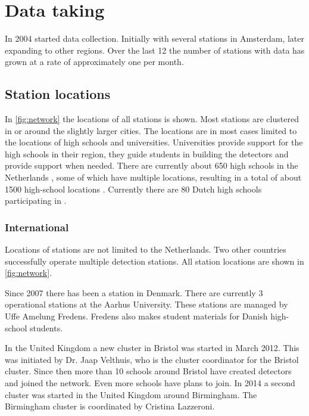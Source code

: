 \section{Data taking}

In 2004 \hisparc started data collection. Initially with several stations in Amsterdam, later expanding to other regions. Over the last \SI{12}{\year} the number of stations with data has grown at a rate of approximately one per month.


\subsection{Station locations}

In \cref{fig:network} the locations of all \hisparc stations is shown. Most stations are clustered in or around the slightly larger cities. The locations are in most cases limited to the locations of high schools and universities. Universities provide support for the high schools in their region, they guide students in building the detectors and provide support when needed. There are currently about \num{650} high schools in the Netherlands  \cite{duo2016hoofd}, some of which have multiple locations, resulting in a total of about \num{1500} high-school locations \cite{duo2016all}. Currently there are \num{80} Dutch high schools participating in \hisparc.


\subsubsection{International}

Locations of \hisparc stations are not limited to the Netherlands. Two other countries successfully operate multiple detection stations. All station locations are shown in \cref{fig:network}.

Since 2007 there has been a \hisparc station in Denmark. There are currently 3 operational stations at the Aarhus University. These stations are managed by Uffe Amelung Fredens. Fredens also makes student materials for Danish high-school students.

In the United Kingdom a new cluster in Bristol was started in March 2012. This was initiated by Dr. Jaap Velthuis, who is the cluster coordinator for the Bristol cluster. Since then more than 10 schools around Bristol have created detectors and joined the network. Even more schools have plans to join. In 2014 a second cluster was started in the United Kingdom around Birmingham. The Birmingham cluster is coordinated by Cristina Lazzeroni.

